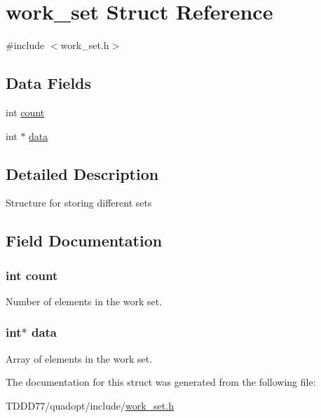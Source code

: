 \hypertarget{structwork__set}{}\section{work\+\_\+set Struct Reference}
\label{structwork__set}


{\ttfamily \#include $<$work\+\_\+set.\+h$>$}

\subsection*{Data Fields}
\begin{DoxyCompactItemize}
\item 
int \hyperlink{structwork__set_ad43c3812e6d13e0518d9f8b8f463ffcf}{count}
\item 
int $\ast$ \hyperlink{structwork__set_ac103627c1ad15cbec2f22d0abe6d54b6}{data}
\end{DoxyCompactItemize}


\subsection{Detailed Description}
Structure for storing different sets 

\subsection{Field Documentation}
\hypertarget{structwork__set_ad43c3812e6d13e0518d9f8b8f463ffcf}{}
\subsubsection[{count}]{\setlength{\rightskip}{0pt plus 5cm}int count}\label{structwork__set_ad43c3812e6d13e0518d9f8b8f463ffcf}
Number of elements in the work set. \hypertarget{structwork__set_ac103627c1ad15cbec2f22d0abe6d54b6}{}
\subsubsection[{data}]{\setlength{\rightskip}{0pt plus 5cm}int$\ast$ data}\label{structwork__set_ac103627c1ad15cbec2f22d0abe6d54b6}
Array of elements in the work set. 

The documentation for this struct was generated from the following file\+:\begin{DoxyCompactItemize}
\item 
T\+D\+D\+D77/quadopt/include/\hyperlink{work__set_8h}{work\+\_\+set.\+h}\end{DoxyCompactItemize}
